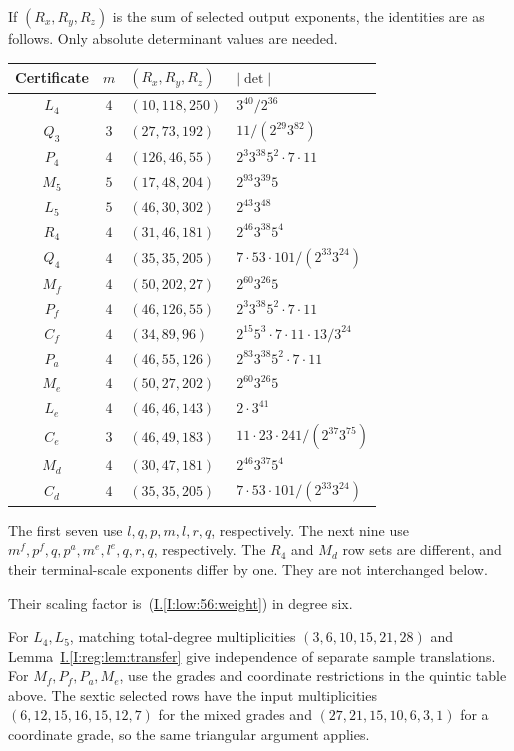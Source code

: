 \documentclass[11pt]{amsart}
\theoremstyle{definition}
\theoremstyle{remark}
\numberwithin{equation}{section}
\newcommand{\partIref}[1]{\hyperref[I:#1]{I.\ref*{I:#1}}}
\newcommand{\partIeqref}[1]{\textup{(\partIref{#1})}}
\begin{document}
If $(R_x,R_y,R_z)$ is the sum of selected output exponents, the identities are as follows. Only absolute determinant values are needed.
\begin{center}
\begin{tabular}{ccll}
Certificate & $m$ & $(R_x,R_y,R_z)$ & $|\det|$\\\hline
$L_4$ & $4$ & $(10,118,250)$ & $3^{40}/2^{36}$\\
$Q_3$ & $3$ & $(27,73,192)$ & $11/(2^{29}3^{82})$\\
$P_4$ & $4$ & $(126,46,55)$ & $2^3 3^{38}5^2\cdot7\cdot11$\\
$M_5$ & $5$ & $(17,48,204)$ & $2^{93}3^{39}5$\\
$L_5$ & $5$ & $(46,30,302)$ & $2^{43}3^{48}$\\
$R_4$ & $4$ & $(31,46,181)$ & $2^{46}3^{38}5^4$\\
$Q_4$ & $4$ & $(35,35,205)$ & $7\cdot53\cdot101/(2^{33}3^{24})$\\
$M_f$ & $4$ & $(50,202,27)$ & $2^{60}3^{26}5$\\
$P_f$ & $4$ & $(46,126,55)$ & $2^3 3^{38}5^2\cdot7\cdot11$\\
$C_f$ & $4$ & $(34,89,96)$ & $2^{15}5^3\cdot7\cdot11\cdot13/3^{24}$\\
$P_a$ & $4$ & $(46,55,126)$ & $2^{83}3^{38}5^2\cdot7\cdot11$\\
$M_e$ & $4$ & $(50,27,202)$ & $2^{60}3^{26}5$\\
$L_e$ & $4$ & $(46,46,143)$ & $2\cdot3^{41}$\\
$C_e$ & $3$ & $(46,49,183)$ & $11\cdot23\cdot241/(2^{37}3^{75})$\\
$M_d$ & $4$ & $(30,47,181)$ & $2^{46}3^{37}5^4$\\
$C_d$ & $4$ & $(35,35,205)$ & $7\cdot53\cdot101/(2^{33}3^{24})$
\end{tabular}
\end{center}
The first seven use $l,q,p,m,l,r,q$, respectively. The next nine use $m^f,p^f,q,p^a,m^e,l^e,q,r,q$, respectively. The $R_4$ and $M_d$ row sets are different, and their terminal-scale exponents differ by one. They are not interchanged below.

Their scaling factor is~\partIeqref{low:56:weight} in degree six.

For $L_4,L_5$, matching total-degree multiplicities $(3,6,10,15,21,28)$ and Lemma~\partIref{reg:lem:transfer} give independence of separate sample translations. For $M_f,P_f,P_a,M_e$, use the grades and coordinate restrictions in the quintic table above. The sextic selected rows have the input multiplicities $(6,12,15,16,15,12,7)$ for the mixed grades and $(27,21,15,10,6,3,1)$ for a coordinate grade, so the same triangular argument applies.
\end{document}
